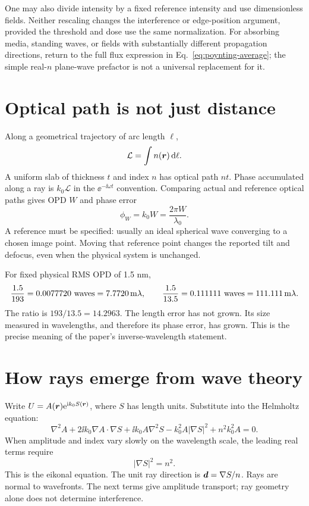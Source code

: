 One may also divide intensity by a fixed reference intensity and use
dimensionless fields. Neither rescaling changes the interference or
edge-position argument, provided the threshold and dose use the same
normalization. For absorbing media, standing waves, or fields with
substantially different propagation directions, return to the full
flux expression in Eq.~\eqref{eq:poynting-average}; the simple
real-$n$ plane-wave prefactor is not a universal replacement for it.

\section{Optical path is not just distance}
Along a geometrical trajectory of arc length $\ell$,
\begin{equation}
\mathcal L=\int n(\bm{r})\,\mathrm{d}\ell.
\label{eq:opl}
\end{equation}
A uniform slab of thickness $t$ and index $n$ has optical path $nt$.
Phase accumulated along a ray is $k_0\mathcal L$ in the
$\ee^{-\ii\omega t}$ convention. Comparing actual and reference optical
paths gives OPD $W$ and phase error
\begin{equation}
\phi_W=k_0 W=\frac{2\pi W}{\lambda_0}.
\label{eq:phaseOPD}
\end{equation}
A reference must be specified: usually an ideal spherical wave converging
to a chosen image point. Moving that reference point changes the
reported tilt and defocus, even when the physical system is unchanged.

For fixed physical RMS OPD of 1.5 nm,
\[
\frac{1.5}{193}=0.0077720\ {\rm waves}
=7.7720\,\mathrm{m}\lambda,\qquad
\frac{1.5}{13.5}=0.111111\ {\rm waves}
=111.111\,\mathrm{m}\lambda.
\]
The ratio is $193/13.5=14.2963$. The length error has not grown.
Its size measured in wavelengths, and therefore its phase error, has grown.
This is the precise meaning of the paper's inverse-wavelength statement.

\section{How rays emerge from wave theory}
Write $U=A(\bm{r})\mathrm{e}^{\mathrm{i} k_0S(\bm{r})}$, where $S$ has length units.
Substitute into the Helmholtz equation:
\[
\nabla^2 A+2\ii k_0\nabla A\cdot\nabla S
+\ii k_0A\nabla^2S-k_0^2A|\nabla S|^2+n^2k_0^2A=0.
\]
When amplitude and index vary slowly on the wavelength scale, the leading
real terms require
\begin{equation}
|\nabla S|^2=n^2.
\label{eq:eikonal}
\end{equation}
This is the eikonal equation. The unit ray direction is
$\bm{d}=\nabla S/n$. Rays are normal to wavefronts.
The next terms give amplitude transport; ray geometry alone does not
determine interference.

